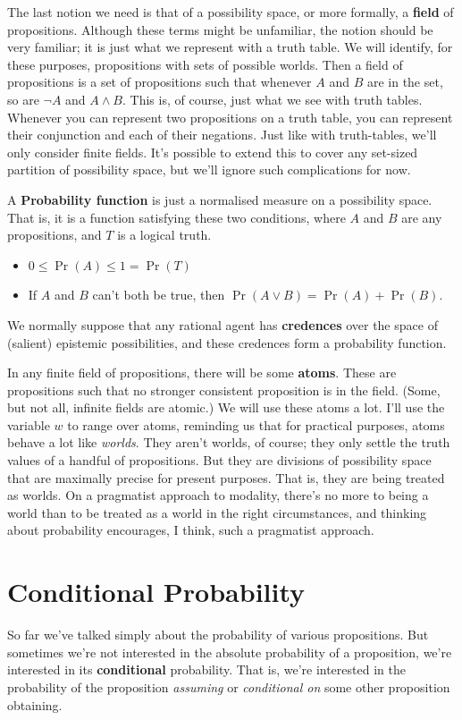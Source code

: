 \documentclass[openany]{book}
\begin{document}
The last notion we need is that of a possibility space, or more formally, a \textbf{field} of propositions. Although these terms might be unfamiliar, the notion should be very familiar; it is just what we represent with a truth table. We will identify, for these purposes, propositions with sets of possible worlds. Then a field of propositions is a set of propositions such that whenever $A$ and $B$ are in the set, so are $\neg A$ and $A \wedge B$. This is, of course, just what we see with truth tables. Whenever you can represent two propositions on a truth table, you can represent their conjunction and each of their negations. Just like with truth-tables, we'll only consider finite fields. It's possible to extend this to cover any set-sized partition of possibility space, but we'll ignore such complications for now. 

A \textbf{Probability function} is just a normalised measure on a possibility space. That is, it is a function satisfying these two conditions, where $A$ and $B$ are any propositions, and $T$ is a logical truth.

\begin{itemize}
\item $0 \leq \Pr(A) \leq 1 = \Pr(T)$
\item If $A$ and $B$ can't both be true, then $\Pr(A \vee B) = \Pr(A) + \Pr(B)$.
\end{itemize}

\noindent We normally suppose that any rational agent has \textbf{credences} over the space of (salient) epistemic possibilities, and these credences form a probability function.

In any finite field of propositions, there will be some \textbf{atoms}. These are propositions such that no stronger consistent proposition is in the field. (Some, but not all, infinite fields are atomic.) We will use these atoms a lot. I'll use the variable $w$ to range over atoms, reminding us that for practical purposes, atoms behave a lot like \textit{worlds}. They aren't worlds, of course; they only settle the truth values of a handful of propositions. But they are divisions of possibility space that are maximally precise for present purposes. That is, they are being treated as worlds. On a pragmatist approach to modality, there's no more to being a world than to be treated as a world in the right circumstances, and thinking about probability encourages, I think, such a pragmatist approach.

\section{Conditional Probability}
So far we've talked simply about the probability of various propositions. But sometimes we're not interested in the absolute probability of a proposition, we're interested in its \textbf{conditional} probability. That is, we're interested in the probability of the proposition \textit{assuming} or \textit{conditional on} some other proposition obtaining.
\end{document}
